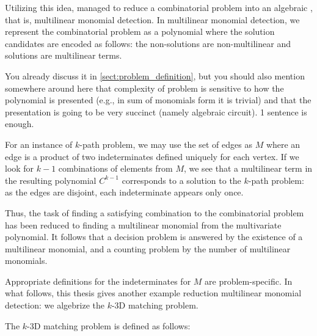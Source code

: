 Utilizing this idea, \citeauthor{Koutis05} \cite{Koutis05} 
managed to reduce a combinatorial problem 
into an algebraic , that is, multilinear monomial detection. 
In multilinear monomial detection, we represent the combinatorial problem 
as a polynomial where the solution candidates are encoded as follows: 
the non-solutions are non-multilinear and solutions are multilinear terms. 

\begin{anamnote}[nomargin]{}
  You already discuss it in \cref{sect:problem_definition}, but you should also
  mention somewhere around here that complexity of problem is sensitive to how
  the polynomial is presented (e.g., in sum of monomials form it is trivial) and
  that the presentation is going to be very succinct (namely algebraic circuit).
  1 sentence is enough.
\end{anamnote}

For an instance of $k$-path problem, we may use the set of edges as $M$ where 
an edge is a product of two indeterminates defined uniquely for each vertex. 
If we look for $k-1$ combinations of elements from $M$, we see that a 
multilinear term in the resulting polynomial $C^{k-1}$ corresponds to a 
solution to the $k$-path problem: as the edges are disjoint, each indeterminate 
appears only once.

Thus, the task of finding a satisfying combination 
to the combinatorial problem has been reduced to 
finding a multilinear monomial from the multivariate polynomial.
It follows that a decision problem is answered by 
the existence of a multilinear monomial, 
and a counting problem by the number of multilinear monomials. 

Appropriate definitions for the indeterminates for $M$ are problem-specific. 
In what follows, this thesis gives another example 
reduction  multilinear monomial detection: we algebrize the $k$-3D matching problem.

The $k$-3D matching problem is defined as follows:
\begin{problem}
\end{problem}

